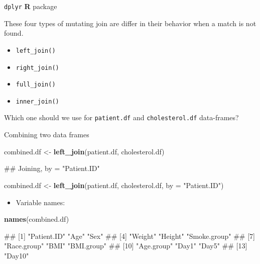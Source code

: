 \documentclass[ignorenonframetext,]{beamer}
\newenvironment{Shaded}{\begin{snugshade}}{\end{snugshade}}
\newcommand{\KeywordTok}[1]{\textcolor[rgb]{0.13,0.29,0.53}{\textbf{#1}}}
\newcommand{\DataTypeTok}[1]{\textcolor[rgb]{0.13,0.29,0.53}{#1}}
\newcommand{\StringTok}[1]{\textcolor[rgb]{0.31,0.60,0.02}{#1}}
\newcommand{\NormalTok}[1]{#1}
\providecommand{\tightlist}{%
  \setlength{\itemsep}{0pt}\setlength{\parskip}{0pt}}
\let\oldShaded\Shaded
\let\endoldShaded\endShaded
\renewenvironment{Shaded}{\footnotesize\oldShaded}{\endoldShaded}
\let\oldverbatim\verbatim
\let\endoldverbatim\endverbatim
\renewenvironment{verbatim}{\footnotesize\oldverbatim}{\endoldverbatim}
\begin{document}
\begin{frame}[fragile]{\texttt{dplyr} \textbf{R} package}

These four types of mutating join are differ in their behavior when a
match is not found.

\begin{itemize}
\tightlist
\item
  \texttt{left\_join()}
\item
  \texttt{right\_join()}
\item
  \texttt{full\_join()}
\item
  \texttt{inner\_join()}
\end{itemize}

Which one should we use for \texttt{patient.df} and
\texttt{cholesterol.df} data-frames?

\end{frame}

\begin{frame}[fragile]{Combining two data frames}

\begin{Shaded}
\begin{Highlighting}[]
\NormalTok{combined.df <-}\StringTok{ }\KeywordTok{left_join}\NormalTok{(patient.df, cholesterol.df)}
\end{Highlighting}
\end{Shaded}

\begin{verbatim}
## Joining, by = "Patient.ID"
\end{verbatim}

\begin{Shaded}
\begin{Highlighting}[]
\NormalTok{combined.df <-}\StringTok{ }\KeywordTok{left_join}\NormalTok{(patient.df, cholesterol.df, }
    \DataTypeTok{by =} \StringTok{"Patient.ID"}\NormalTok{)}
\end{Highlighting}
\end{Shaded}

\begin{itemize}
\tightlist
\item
  Variable names:
\end{itemize}

\begin{Shaded}
\begin{Highlighting}[]
\KeywordTok{names}\NormalTok{(combined.df)}
\end{Highlighting}
\end{Shaded}

\begin{verbatim}
##  [1] "Patient.ID"  "Age"         "Sex"        
##  [4] "Weight"      "Height"      "Smoke.group"
##  [7] "Race.group"  "BMI"         "BMI.group"  
## [10] "Age.group"   "Day1"        "Day5"       
## [13] "Day10"
\end{verbatim}

\end{frame}
\end{document}

